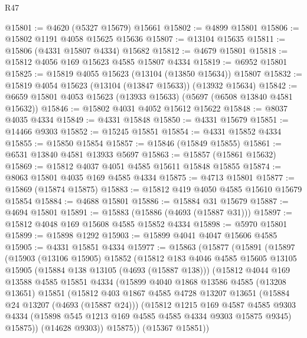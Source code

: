 \begin{lexlean}{R47}
\begin{coremodule}
@15801 := @4620 (@5327 @15679) @15661
@15802 := @4899 @15801
@15806 := @15802 @1191 @4058 @15625 @15636
@15807 := @13104 @15635
@15811 := @15806 (@4331 @15807 @4334) @15682
@15812 := @4679 @15801
@15818 := @15812 @4056 @169 @15623 @4585 @15807 @4334
@15819 := @6952 @15801
@15825 := @15819 @4055 @15623 (@13104 (@13850 @15634)) @15807
@15832 := @15819 @4054 @15623 (@13104 (@13847 @15633)) (@13932 @15634)
@15842 := @6659 @15801 @4053 @15623 (@13933 @15633) (@5697 (@6508 @13840 @4581 @15632))
@15846 := @15802 @4031 @4052 @15612 @15622
@15848 := @8037 @4035 @4334
@15849 := @4331 @15848
@15850 := @4331 @15679
@15851 := @14466 @9303
@15852 := @15245 @15851
@15854 := @4331 @15852 @4334
@15855 := @15850 @15854
@15857 := @15846 (@15849 @15855)
@15861 := @6531 @13840 @4581 @13933 @5697
@15863 := @15857 (@15861 @15632)
@15869 := @15812 @4037 @4051 @4585 @15611 @15848 @15855
@15874 := @8063 @15801 @4035 @169 @4585 @4334
@15875 := @4713 @15801
@15877 := @15869 (@15874 @15875)
@15883 := @15812 @419 @4050 @4585 @15610 @15679 @15854
@15884 := @4688 @15801
@15886 := @15884 @31 @15679
@15887 := @4694 @15801
@15891 := @15883 (@15886 (@4693 (@15887 @31)))
@15897 := @15812 @4048 @169 @15608 @4585 @15852 @4334
@15898 := @5970 @15801
@15899 := @15898 @1292
@15903 := @15899 @4041 @4047 @15606 @4585
@15905 := @4331 @15851 @4334
@15977 := @15863
    (@15877
      (@15891
        (@15897
          (@15903
            (@13106 @15905)
            @15852
            (@15812
              @183
              @4046
              @4585
              @15605
              @13105
              @15905
              (@15884 @138 @13105 (@4693 (@15887 @138)))
              (@15812
                @4044
                @169
                @13588
                @4585
                @15851
                @4334
                (@15899
                  @4040
                  @1868
                  @13586
                  @4585
                  (@13208 @13651)
                  @15851
                  (@15812
                    @403
                    @1867
                    @4585
                    @4728
                    @13207
                    @13651
                    (@15884 @24 @13207 (@4693 (@15887 @24)))
                    (@15812
                      @1215
                      @169
                      @4587
                      @4585
                      @9303
                      @4334
                      (@15898 @545 @1213 @169 @4585 @4585 @4334 @9303 @15875 @9345)
                      @15875))
                  (@14628 @9303))
                @15875))
            (@15367 @15851))

\end{coremodule}
\end{lexlean}
